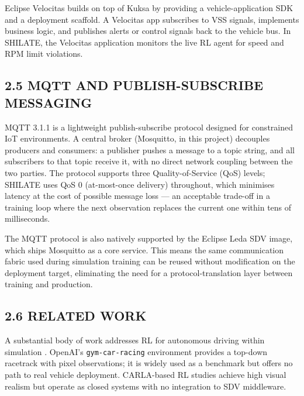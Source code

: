 \documentclass[12pt,a4paper]{article}
\begin{document}
Eclipse Velocitas \cite{EclipseVelocitas2024} builds on top of Kuksa by
providing a vehicle-application SDK and a deployment scaffold. A Velocitas app
subscribes to VSS signals, implements business logic, and publishes alerts or
control signals back to the vehicle bus. In SHILATE, the Velocitas application
monitors the live RL agent for speed and RPM limit violations.

\subsection*{2.5 \quad MQTT AND PUBLISH-SUBSCRIBE MESSAGING}

\indent MQTT 3.1.1 \cite{OASIS2014} is a lightweight publish-subscribe protocol
designed for constrained IoT environments. A central broker (Mosquitto, in
this project) decouples producers and consumers: a publisher pushes a message
to a topic string, and all subscribers to that topic receive it, with no
direct network coupling between the two parties. The protocol supports three
Quality-of-Service (QoS) levels; SHILATE uses QoS 0 (at-most-once delivery)
throughout, which minimises latency at the cost of possible message loss ---
an acceptable trade-off in a training loop where the next observation replaces
the current one within tens of milliseconds.

The MQTT protocol is also natively supported by the Eclipse Leda SDV image,
which ships Mosquitto as a core service. This means the same communication
fabric used during simulation training can be reused without modification on
the deployment target, eliminating the need for a protocol-translation layer
between training and production.

\subsection*{2.6 \quad RELATED WORK}

\indent A substantial body of work addresses RL for autonomous driving within
simulation \cite{Kiran2021}. OpenAI's \texttt{gym-car-racing} environment
\cite{Brockman2016} provides a top-down racetrack with pixel observations; it
is widely used as a benchmark but offers no path to real vehicle deployment.
CARLA-based RL studies \cite{Dosovitskiy2017} achieve high visual realism but
operate as closed systems with no integration to SDV middleware.
\end{document}
